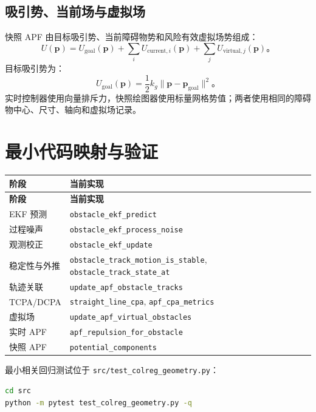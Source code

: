 \documentclass[UTF8,11pt,a4paper]{ctexart}
\begin{document}




\subsection{吸引势、当前场与虚拟场}
快照 APF 由目标吸引势、当前障碍物势和风险有效虚拟场势组成：
\[
U(\bm{p})=U_{\mathrm{goal}}(\bm{p})+
\sum_iU_{\mathrm{current},i}(\bm{p})+
\sum_jU_{\mathrm{virtual},j}(\bm{p})。
\]
目标吸引势为：
\[
U_{\mathrm{goal}}(\bm{p})=\frac12k_g\|\bm{p}-\bm{p}_{\mathrm{goal}}\|^2。
\]
实时控制器使用向量排斥力，快照绘图器使用标量网格势值；两者使用相同的障碍物中心、尺寸、轴向和虚拟场记录。




\section{最小代码映射与验证}
\begin{longtable}{>{\raggedright\arraybackslash}p{}p{}}
\toprule
\textbf{阶段} & \textbf{当前实现} \\
\midrule
\endfirsthead
\toprule
\textbf{阶段} & \textbf{当前实现} \\
\midrule
\endhead
EKF 预测 & \texttt{obstacle\_ekf\_predict} \\
过程噪声 & \texttt{obstacle\_ekf\_process\_noise} \\
观测校正 & \texttt{obstacle\_ekf\_update} \\
稳定性与外推 & \texttt{obstacle\_track\_motion\_is\_stable}, \texttt{obstacle\_track\_state\_at} \\
轨迹关联 & \texttt{update\_apf\_obstacle\_tracks} \\
TCPA/DCPA & \texttt{straight\_line\_cpa}, \texttt{apf\_cpa\_metrics} \\
虚拟场 & \texttt{update\_apf\_virtual\_obstacles} \\
实时 APF & \texttt{apf\_repulsion\_for\_obstacle} \\
快照 APF & \texttt{potential\_components} \\
\bottomrule
\end{longtable}

最小相关回归测试位于 \texttt{src/test\_colreg\_geometry.py}：
\begin{lstlisting}[language=bash]
cd src
python -m pytest test_colreg_geometry.py -q
\end{lstlisting}
\end{document}
